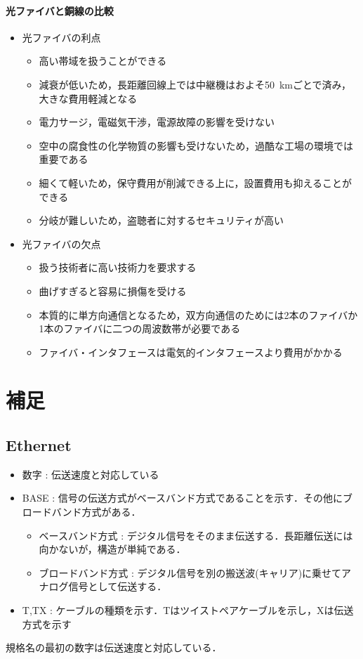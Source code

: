 \documentclass[a4paper]{ltjsarticle}
\begin{document}
			\paragraph{光ファイバと銅線の比較}
				\begin{itemize}
					\item 光ファイバの利点
					\begin{itemize}
						\item 高い帯域を扱うことができる
						\item 減衰が低いため，長距離回線上では中継機はおよそ\SI{50}{km}ごとで済み，大きな費用軽減となる
						\item 電力サージ，電磁気干渉，電源故障の影響を受けない
						\item 空中の腐食性の化学物質の影響も受けないため，過酷な工場の環境では重要である
						\item 細くて軽いため，保守費用が削減できる上に，設置費用も抑えることができる
						\item 分岐が難しいため，盗聴者に対するセキュリティが高い
					\end{itemize}
					\item 光ファイバの欠点
					\begin{itemize}
						\item 扱う技術者に高い技術力を要求する
						\item 曲げすぎると容易に損傷を受ける
						\item 本質的に単方向通信となるため，双方向通信のためには2本のファイバか1本のファイバに二つの周波数帯が必要である
						\item ファイバ・インタフェースは電気的インタフェースより費用がかかる
					\end{itemize}
				\end{itemize}

\section{補足}
	\subsection{Ethernet}
		\begin{itemize}
			\item 数字 : 伝送速度と対応している
			\item BASE : 信号の伝送方式がベースバンド方式であることを示す．その他にブロードバンド方式がある．
			\begin{itemize}
				\item ベースバンド方式 : デジタル信号をそのまま伝送する．長距離伝送には向かないが，構造が単純である．
				\item ブロードバンド方式 : デジタル信号を別の搬送波(キャリア)に乗せてアナログ信号として伝送する．
			\end{itemize}
			\item T,TX : ケーブルの種類を示す．Tはツイストペアケーブルを示し，Xは伝送方式を示す
		\end{itemize}
		規格名の最初の数字は伝送速度と対応している．
\end{document}
